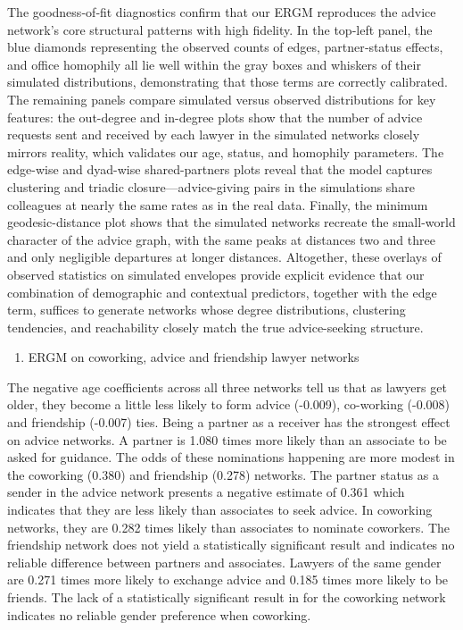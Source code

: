\documentclass[
]{article}
\providecommand{\tightlist}{%
  \setlength{\itemsep}{0pt}\setlength{\parskip}{0pt}}
\begin{document}
The goodness‐of‐fit diagnostics confirm that our ERGM reproduces the
advice network's core structural patterns with high fidelity. In the
top‐left panel, the blue diamonds representing the observed counts of
edges, partner‐status effects, and office homophily all lie well within
the gray boxes and whiskers of their simulated distributions,
demonstrating that those terms are correctly calibrated. The remaining
panels compare simulated versus observed distributions for key features:
the out-degree and in-degree plots show that the number of advice
requests sent and received by each lawyer in the simulated networks
closely mirrors reality, which validates our age, status, and homophily
parameters. The edge-wise and dyad-wise shared-partners plots reveal
that the model captures clustering and triadic closure---advice-giving
pairs in the simulations share colleagues at nearly the same rates as in
the real data. Finally, the minimum geodesic-distance plot shows that
the simulated networks recreate the small-world character of the advice
graph, with the same peaks at distances two and three and only
negligible departures at longer distances. Altogether, these overlays of
observed statistics on simulated envelopes provide explicit evidence
that our combination of demographic and contextual predictors, together
with the edge term, suffices to generate networks whose degree
distributions, clustering tendencies, and reachability closely match the
true advice-seeking structure.

\begin{enumerate}
\def\labelenumi{\arabic{enumi}.}
\setcounter{enumi}{3}
\tightlist
\item
  ERGM on coworking, advice and friendship lawyer networks
\end{enumerate}

The negative age coefficients across all three networks tell us that as
lawyers get older, they become a little less likely to form advice
(-0.009), co-working (-0.008) and friendship (-0.007) ties. Being a
partner as a receiver has the strongest effect on advice networks. A
partner is 1.080 times more likely than an associate to be asked for
guidance. The odds of these nominations happening are more modest in the
coworking (0.380) and friendship (0.278) networks. The partner status as
a sender in the advice network presents a negative estimate of 0.361
which indicates that they are less likely than associates to seek
advice. In coworking networks, they are 0.282 times likely than
associates to nominate coworkers. The friendship network does not yield
a statistically significant result and indicates no reliable difference
between partners and associates. Lawyers of the same gender are 0.271
times more likely to exchange advice and 0.185 times more likely to be
friends. The lack of a statistically significant result in for the
coworking network indicates no reliable gender preference when
coworking.
\end{document}
